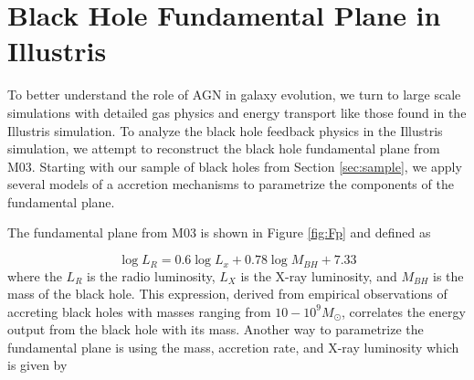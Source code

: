 \section{Black Hole Fundamental Plane in Illustris}

\label{sec:analysis} To better understand the role of AGN in galaxy
evolution, we turn to large scale simulations with detailed gas physics
and energy transport like those found in the Illustris simulation.
To analyze the black hole feedback physics in the Illustris simulation,
we attempt to reconstruct the black hole fundamental plane from M03.
Starting with our sample of black holes from Section \ref{sec:sample},
we apply several models of a accretion mechanisms to parametrize the
components of the fundamental plane.

The fundamental plane from M03 is shown in Figure \ref{fig:Fp} and
defined as

\begin{equation}
\log L_{R}=0.6\log L_{x}+0.78\log M_{BH}+7.33
\end{equation}
where the $L_{R}$ is the radio luminosity, $L_{X}$ is the X-ray
luminosity, and $M_{BH}$ is the mass of the black hole. This expression,
derived from empirical observations of accreting black holes with
masses ranging from $10-10^{9}M_{\odot}$, correlates the energy output
from the black hole with its mass. Another way to parametrize the
fundamental plane is using the mass, accretion rate, and X-ray luminosity
which is given by

